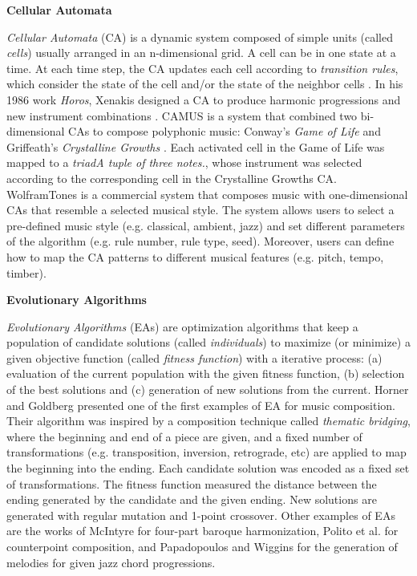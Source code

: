 \vspace{0.1in}
\noindent
\textbf{Cellular Automata}

\noindent
\textit{Cellular Automata} (CA) is a dynamic system composed of simple units (called \textit{cells}) usually arranged in an n-dimensional grid. A cell can be in one state at a time. At each time step, the CA updates each cell according to \textit{transition rules}, which consider the state of the cell and/or the state of the neighbor cells \cite{wolfram2002new}. In his 1986 work \textit{Horos}, Xenakis designed a CA to produce harmonic progressions and new instrument combinations \cite{solomos2005cellular}. CAMUS \cite{miranda1993cellular} is a system that combined two bi-dimensional CAs to compose polyphonic music: Conway's \textit{Game of Life} \cite{gardner1970} and Griffeath’s \textit{Crystalline Growths} \cite{dewdney1989}. Each activated cell in the Game of Life was mapped to a \textit{triad}\textit{A tuple of three notes.}, whose instrument was selected according to the corresponding cell in the Crystalline Growths CA. WolframTones \cite{ball2005making} is a commercial system that composes music with one-dimensional CAs that resemble a selected musical style. The system allows users to select a pre-defined music style (e.g. classical, ambient, jazz) and set different parameters of the algorithm (e.g. rule number, rule type, seed). Moreover, users can define how to map the CA patterns to different musical features (e.g. pitch, tempo, timber).

\vspace{0.1in}
\noindent
\textbf{Evolutionary Algorithms}

\noindent
\textit{Evolutionary Algorithms} (EAs) are optimization algorithms that keep a population of candidate solutions (called \textit{individuals}) to maximize (or minimize) a given objective function (called \textit{fitness function}) with a iterative process: (a) evaluation of the current population with the given fitness function, (b) selection of the best solutions and (c) generation of new solutions from the current. Horner and Goldberg \cite{horner1991genetic} presented one of the first examples of EA for music composition. Their algorithm was inspired by a composition technique called \textit{thematic bridging}, where the beginning and end of a piece are given, and a fixed number of transformations (e.g. transposition, inversion, retrograde, etc) are applied to map the beginning into the ending. Each candidate solution was encoded as a fixed set of transformations. The fitness function measured the distance between the ending generated by the candidate and the given ending. New solutions are generated with regular mutation and 1-point crossover. Other examples of EAs are the works of McIntyre \cite{mcintyre1994bach} for four-part baroque harmonization, Polito et al. \cite{polito1997musica} for counterpoint composition, and Papadopoulos and Wiggins \cite{papadopoulos1998genetic} for the generation of melodies for given jazz chord progressions.


